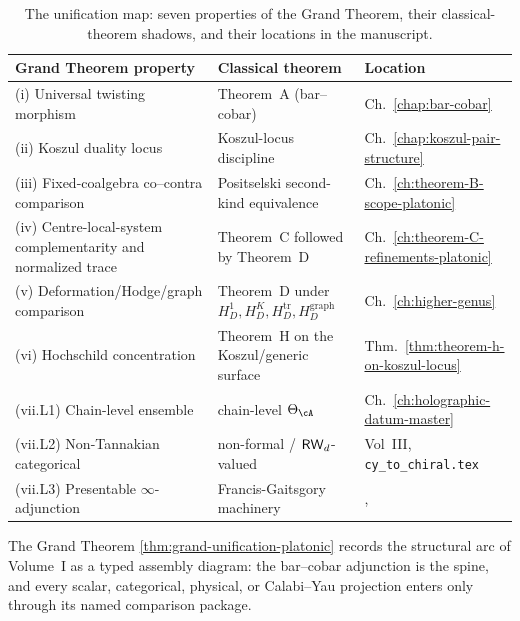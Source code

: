 \begin{table}[h]
\centering
\begin{tabular}{l|l|l}
\hline
\textbf{Grand Theorem property} & \textbf{Classical theorem} & \textbf{Location} \\
\hline
(i) Universal twisting morphism & Theorem~A (bar--cobar) & Ch.~\ref{chap:bar-cobar} \\
(ii) Koszul duality locus & Koszul-locus discipline & Ch.~\ref{chap:koszul-pair-structure} \\
(iii) Fixed-coalgebra co--contra comparison & Positselski second-kind equivalence & Ch.~\ref{ch:theorem-B-scope-platonic} \\
(iv) Centre-local-system complementarity and normalized trace & Theorem~C followed by Theorem~D & Ch.~\ref{ch:theorem-C-refinements-platonic} \\
(v) Deformation/Hodge/graph comparison & Theorem~D under $H_D^1,H_D^K,H_D^{\mathrm{tr}},H_D^{\mathrm{graph}}$ & Ch.~\ref{ch:higher-genus} \\
(vi) Hochschild concentration & Theorem~H on the Koszul/generic surface & Thm.~\ref{thm:theorem-h-on-koszul-locus} \\
(vii.L1) Chain-level ensemble & chain-level $\Theta_\cA$ & Ch.~\ref{ch:holographic-datum-master} \\
(vii.L2) Non-Tannakian categorical & non-formal / $\mathsf{RW}_d$-valued & Vol~III, \texttt{cy\_to\_chiral.tex} \\
(vii.L3) Presentable $\infty$-adjunction & Francis-Gaitsgory machinery & \cite[\S6]{FG11}, \cite[HA~5.2]{LurieDAGX} \\
\hline
\end{tabular}
\caption{The unification map: seven properties of the Grand
Theorem, their classical-theorem shadows, and their locations in
the manuscript.}
\label{tab:gu-unification-map-platonic}
\end{table}

The Grand Theorem
\ref{thm:grand-unification-platonic} records the structural arc of
Volume~I as a typed assembly diagram: the bar--cobar adjunction is the
spine, and every scalar, categorical, physical, or Calabi--Yau
projection enters only through its named comparison package.
